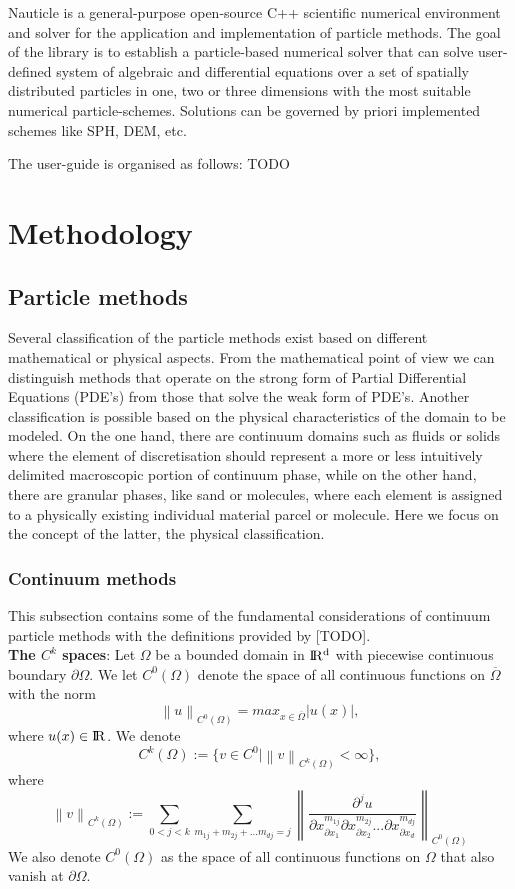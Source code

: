 \documentclass[a4paper,12pt,openany]{book}
\newcommand{\R}{\rm I\!R}
\newcommand{\norm}[1]{\left\lVert#1\right\rVert}
\theoremstyle{break}
\begin{document}
Nauticle is a general-purpose open-source C++ scientific numerical environment and solver for the application and implementation of particle methods. The goal of the library is to  establish a particle-based numerical solver that can solve user-defined system of algebraic and differential equations over a set of spatially distributed particles in one, two or three dimensions with the most suitable numerical particle-schemes. Solutions can be governed by priori implemented schemes like SPH, DEM, etc. 

The user-guide is organised as follows: TODO

\section{Methodology}
\subsection{Particle methods} \label{sec:particle_method_classification}
Several classification of the particle methods exist based on different mathematical or physical aspects. From the mathematical point of view we can distinguish methods that operate on the strong form of Partial Differential Equations (PDE's) from those that solve the weak form of PDE's. Another classification is possible based on the physical characteristics of the domain to be modeled. On the one hand, there are continuum domains such as fluids or solids where the element of discretisation should represent a more or less intuitively delimited macroscopic portion of continuum phase, while on the other hand, there are granular phases, like sand or molecules, where each element is assigned to a physically existing individual material parcel or molecule. Here we focus on the concept of the latter, the physical classification.
\subsubsection{Continuum methods}
This subsection contains some of the fundamental considerations of continuum particle methods with the definitions provided by [TODO]. \\

\textbf{The $C^k$ spaces}: Let $\Omega$ be a bounded domain in $\R^d$ with piecewise continuous boundary $\partial\Omega$. We let $C^0(\Omega)$ denote the space of all continuous functions on $\overline{\Omega}$ with the norm
\begin{equation}
\norm{u}_{C^0(\Omega)}=max_{x\in\overline{\Omega}}|u(x)|,
\end{equation}
where $u(x)\in\R$. We denote
\begin{equation}
C^k(\Omega):=\{v\in C^0\vert\norm{v}_{C^k (\Omega)}<\infty\},
\end{equation}
where
\begin{equation}
\norm{v}_{C^k (\Omega)}:=\sum_{0<j<k}\sum_{m_{1j}+m_{2j}+...m_{dj}=j}\norm{\frac{\partial^j u}{\partial x^{m_{1j}}_{\partial x_1}\partial x^{m_{2j}}_{\partial x_2}...\partial x^{m_{dj}}_{\partial x_d}}}_{C^0(\Omega)}
\end{equation}
We also denote $C^0(\Omega)$ as the space of all continuous functions on $\Omega$ that also vanish at $\partial\Omega$.
\end{document}
